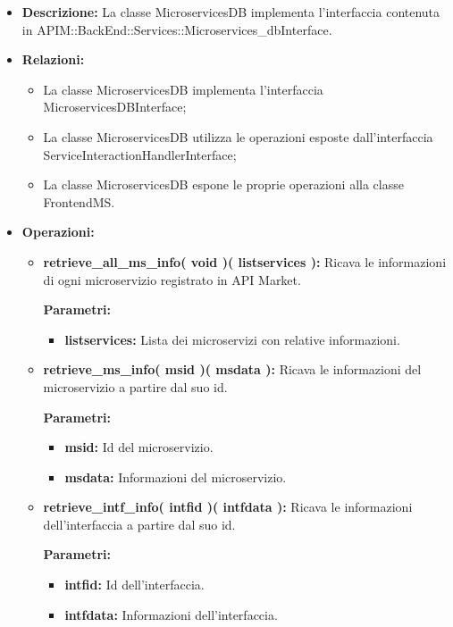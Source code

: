 \begin{itemize}
	\item \textbf{Descrizione:} La classe MicroservicesDB implementa l'interfaccia contenuta in APIM::BackEnd::Services::Microservices\_dbInterface.
	\item \textbf{Relazioni:}
		\begin{itemize}
			\item La classe MicroservicesDB implementa l'interfaccia MicroservicesDBInterface;
			\item La classe MicroservicesDB utilizza le operazioni esposte dall'interfaccia ServiceInteractionHandlerInterface;
			\item La classe MicroservicesDB espone le proprie operazioni alla classe FrontendMS.
		\end{itemize}
	\item \textbf{Operazioni:}
		\begin{itemize}
		
			\item \textbf{retrieve\_all\_ms\_info( void )( listservices ):} Ricava le informazioni di ogni microservizio registrato in API Market.
				\begin{description}
    				\item[\textbf{Parametri:}]
				\end{description}
				\begin{itemize}
					\item \textbf{listservices:} Lista dei microservizi con relative informazioni.
				\end{itemize}
				
			\item \textbf{retrieve\_ms\_info( msid )( msdata ):} Ricava le informazioni del microservizio a partire dal suo id.
				\begin{description}
    				\item[\textbf{Parametri:}]
				\end{description}
				\begin{itemize}
					\item \textbf{msid:} Id del microservizio.
					\item \textbf{msdata:} Informazioni del microservizio.
				\end{itemize}
				
			\item \textbf{retrieve\_intf\_info( intfid )( intfdata ):} Ricava le informazioni dell'interfaccia a partire dal suo id.
				\begin{description}
    				\item[\textbf{Parametri:}]
				\end{description}
				\begin{itemize}
					\item \textbf{intfid:} Id dell'interfaccia.
					\item \textbf{intfdata:} Informazioni dell'interfaccia.
				\end{itemize}
				

\end{itemize}
\end{itemize}
